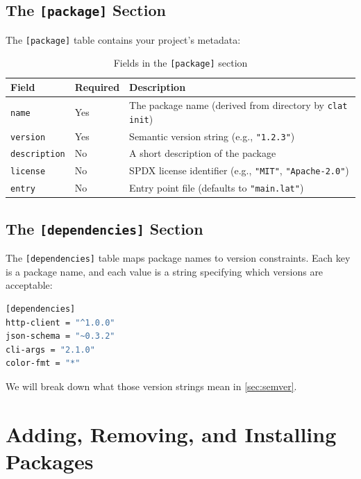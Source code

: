 \subsection{The \texttt{[package]} Section}\label{subsec:package-section}

The \texttt{[package]} table contains your project's metadata:

\begin{table}[h]
\centering
\caption{Fields in the \texttt{[package]} section}\label{tab:package-fields}
\begin{tabular}{@{}lll@{}}
\toprule
\textbf{Field} & \textbf{Required} & \textbf{Description} \\
\midrule
\texttt{name}        & Yes & The package name (derived from directory by \texttt{clat init}) \\
\texttt{version}     & Yes & Semantic version string (e.g., \texttt{"1.2.3"}) \\
\texttt{description} & No  & A short description of the package \\
\texttt{license}     & No  & SPDX license identifier (e.g., \texttt{"MIT"}, \texttt{"Apache-2.0"}) \\
\texttt{entry}       & No  & Entry point file (defaults to \texttt{"main.lat"}) \\
\bottomrule
\end{tabular}
\end{table}

\subsection{The \texttt{[dependencies]} Section}\label{subsec:dependencies-section}

The \texttt{[dependencies]} table maps package names to version constraints.
Each key is a package name, and each value is a string specifying which versions are acceptable:

\begin{lstlisting}[language=bash, numbers=none]
[dependencies]
http-client = "^1.0.0"
json-schema = "~0.3.2"
cli-args = "2.1.0"
color-fmt = "*"
\end{lstlisting}

We will break down what those version strings mean in \cref{sec:semver}.

\section{Adding, Removing, and Installing Packages}\label{sec:add-remove-install}

